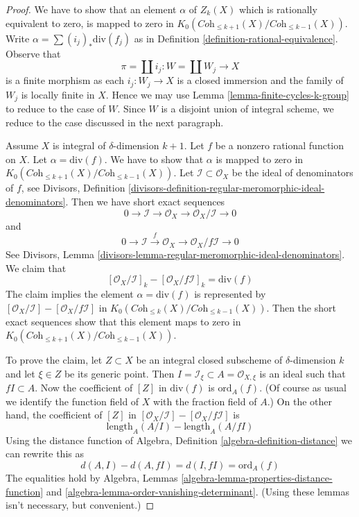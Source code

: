 \begin{proof}
We have to show that an element $\alpha$ of $Z_k(X)$ which is rationally
equivalent to zero, is mapped to zero in
$K_0(\textit{Coh}_{\leq k + 1}(X)/\textit{Coh}_{\leq k - 1}(X))$.
Write $\alpha = \sum (i_j)_*\text{div}(f_j)$ as in
Definition \ref{definition-rational-equivalence}.
Observe that
$$
\pi = \coprod i_j : W = \coprod W_j \longrightarrow X
$$
is a finite morphism as each $i_j : W_j \to X$ is a closed immersion
and the family of $W_j$ is locally finite in $X$. Hence we may use
Lemma \ref{lemma-finite-cycles-k-group} to reduce to the case of $W$.
Since $W$ is a disjoint union of integral scheme, we reduce
to the case discussed in the next paragraph.

\medskip\noindent
Assume $X$ is integral of $\delta$-dimension $k + 1$.
Let $f$ be a nonzero rational function on $X$.
Let $\alpha = \text{div}(f)$. We have to show that
$\alpha$ is mapped to zero in
$K_0(\textit{Coh}_{\leq k + 1}(X)/\textit{Coh}_{\leq k - 1}(X))$.
Let $\mathcal{I} \subset \mathcal{O}_X$ be the ideal of denominators
of $f$, see Divisors, Definition
\ref{divisors-definition-regular-meromorphic-ideal-denominators}.
Then we have short exact sequences
$$
0 \to \mathcal{I} \to \mathcal{O}_X \to \mathcal{O}_X/\mathcal{I} \to 0
$$
and
$$
0 \to \mathcal{I} \xrightarrow{f} \mathcal{O}_X \to
\mathcal{O}_X/f\mathcal{I} \to 0
$$
See Divisors, Lemma
\ref{divisors-lemma-regular-meromorphic-ideal-denominators}.
We claim that
$$
[\mathcal{O}_X/\mathcal{I}]_k - [\mathcal{O}_X/f\mathcal{I}]_k =
\text{div}(f)
$$
The claim implies the element $\alpha = \text{div}(f)$ is represented by
$[\mathcal{O}_X/\mathcal{I}] - [\mathcal{O}_X/f\mathcal{I}]$
in $K_0(\textit{Coh}_{\leq k}(X)/\textit{Coh}_{\leq k - 1}(X))$.
Then the short exact sequences show that this element maps to
zero in $K_0(\textit{Coh}_{\leq k + 1}(X)/\textit{Coh}_{\leq k - 1}(X))$.

\medskip\noindent
To prove the claim, let $Z \subset X$ be an integral closed subscheme
of $\delta$-dimension $k$ and let $\xi \in Z$ be its generic point.
Then $I = \mathcal{I}_\xi \subset A = \mathcal{O}_{X, \xi}$
is an ideal such that $fI \subset A$. Now the coefficient of
$[Z]$ in $\text{div}(f)$ is $\text{ord}_A(f)$. (Of course as usual
we identify the function field of $X$ with the fraction field of $A$.)
On the other hand, the coefficient of $[Z]$ in
$[\mathcal{O}_X/\mathcal{I}] - [\mathcal{O}_X/f\mathcal{I}]$
is
$$
\text{length}_A(A/I) - \text{length}_A(A/fI)
$$
Using the distance function of
Algebra, Definition \ref{algebra-definition-distance}
we can rewrite this as
$$
d(A, I) - d(A, fI) = d(I, fI) = \text{ord}_A(f)
$$
The equalities hold by Algebra, Lemmas
\ref{algebra-lemma-properties-distance-function} and
\ref{algebra-lemma-order-vanishing-determinant}.
(Using these lemmas isn't necessary, but convenient.)
\end{proof}

